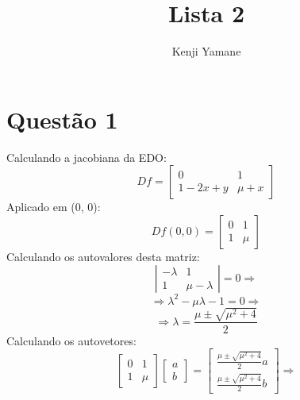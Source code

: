 \documentclass{article}[twocolumn]
\title{Lista 2}
\author{Kenji Yamane}
\begin{document}
	\maketitle
	\section{Quest\~ao 1}
	Calculando a jacobiana da EDO:
	\begin{equation}
		Df = \left[\begin{array}{cc}
			0 & 1\\
			1 - 2x + y & \mu + x
		\end{array}\right]
		\nonumber
	\end{equation}
	Aplicado em (0, 0):
	\begin{equation}
		Df(0, 0) = \left[\begin{array}{cc}
			0 & 1\\
			1 & \mu
		\end{array}\right]
		\nonumber
	\end{equation}
	Calculando os autovalores desta matriz:
	\begin{equation}
		\left|\begin{array}{cc}
			-\lambda & 1\\
			1 & \mu - \lambda
		\end{array}\right| = 0 \Rightarrow
		\nonumber
	\end{equation}
	\begin{equation}
		\Rightarrow \lambda^2 - \mu\lambda - 1 = 0 \Rightarrow
		\nonumber
	\end{equation}
	\begin{equation}
		\Rightarrow \lambda = \frac{\mu \pm \sqrt{\mu^2 + 4}}{2}
		\nonumber
	\end{equation}
	Calculando os autovetores:
	\begin{equation}
		\left[\begin{array}{cc}
			0 & 1\\
			1 & \mu
		\end{array}\right]
		\left[\begin{array}{c}
			a\\b
		\end{array}\right] =
		\left[\begin{array}{c}
			\frac{\mu \pm \sqrt{\mu^2 + 4}}{2}a\\
			\frac{\mu \pm \sqrt{\mu^2 + 4}}{2}b
		\end{array}\right]
		\nonumber \Rightarrow
	\end{equation}
\end{document}
